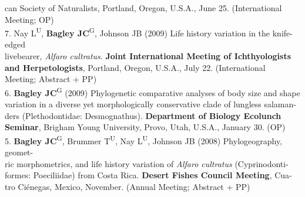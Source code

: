 \documentclass[margin,line]{res}
\begin{document}
\begin{resume}
\hspace*{8mm} can Society of Naturalists, Portland, Oregon, U.S.A., June 25. (International\\ \vspace{2mm}
\hspace*{8mm}Meeting; OP) \\
7. Nay L\textsuperscript{U}, \textbf{Bagley JC}\textsuperscript{G}, Johnson JB (2009) Life history variation in the knife-edged\\
\hspace*{8mm} livebearer, \emph{Alfaro cultratus}. \textbf{Joint International Meeting of Ichthyologists}\\
\hspace*{8mm} \textbf{and Herpetologists}, Portland, Oregon, U.S.A., July 22. (International\\ \vspace{2mm}
\hspace*{8mm}Meeting; Abstract + PP) \\
6. \textbf{Bagley JC}\textsuperscript{G} (2009) Phylogenetic comparative analyses of body size and shape\\
\hspace*{8mm} variation in a diverse yet morphologically conservative clade of lungless salaman-\\
\hspace*{8mm} ders (Plethodontidae: Desmognathus). \textbf{Department of Biology Ecolunch}\\ \vspace{2mm}
\hspace*{8mm}\textbf{Seminar}, Brigham Young University, Provo, Utah, U.S.A., January 30. (OP) \\
5. \textbf{Bagley JC}\textsuperscript{G}, Brummer T\textsuperscript{U}, Nay L\textsuperscript{U}, Johnson JB (2008) Phylogeography, geomet-\\
\hspace*{8mm} ric morphometrics, and life history variation of \emph{Alfaro cultratus} (Cyprinodonti-\\
\hspace*{8mm} formes: Poeciliidae) from Costa Rica. \textbf{Desert Fishes Council Meeting}, Cua-\\ \vspace{2mm}
\hspace*{8mm}tro Ci\'{e}negas, Mexico, November. (Annual Meeting; Abstract + PP) \\

\end{resume}
\end{document}
